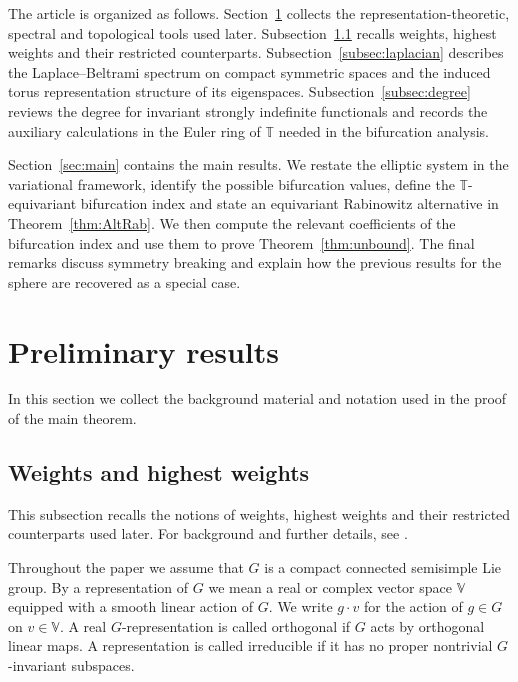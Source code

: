 \documentclass[reqno,twoside,12pt]{amsart}
\newcommand{\bT}{\mathbb{T}}
\newcommand{\bV}{\mathbb{V}}
\numberwithin{equation}{section} \errorcontextlines=0
\begin{document}
The article is organized as follows. Section~\ref{sec:prelim} collects the representation-theoretic, spectral and topological tools used later. Subsection~\ref{sub:weights} recalls weights, highest weights and their restricted counterparts. Subsection~\ref{subsec:laplacian} describes the Laplace--Beltrami spectrum on compact symmetric spaces and the induced torus representation structure of its eigenspaces. Subsection~\ref{subsec:degree} reviews the degree for invariant strongly indefinite functionals and records the auxiliary calculations in the Euler ring of $\bT$ needed in the bifurcation analysis.

Section~\ref{sec:main} contains the main results. We restate the elliptic system in the variational framework, identify the possible bifurcation values, define the $\bT$-equivariant bifurcation index and state an equivariant Rabinowitz alternative in Theorem~\ref{thm:AltRab}. We then compute the relevant coefficients of the bifurcation index and use them to prove Theorem~\ref{thm:unbound}. The final remarks discuss symmetry breaking and explain how the previous results for the sphere are recovered as a special case.



\section{Preliminary results}\label{sec:prelim}

In this section we collect the background material and notation used in the proof of the main theorem.


\subsection{Weights and highest weights}\label{sub:weights}
This subsection recalls the notions of weights, highest weights and their restricted counterparts used later. For background and further details, see \cite{BrockerDieck, FultonHarris, Gurarie, KnappLie}.

Throughout the paper we assume that $G$ is a compact connected semisimple Lie group.
By a representation of $G$ we mean a real or complex vector space $\bV$ equipped with a smooth linear action of $G$. We write $g\cdot v$ for the action of $g\in G$ on $v\in\bV$. A real $G$-representation is called orthogonal if $G$ acts by orthogonal linear maps. A representation is called irreducible if it has no proper nontrivial $G$-invariant subspaces.
\end{document}
